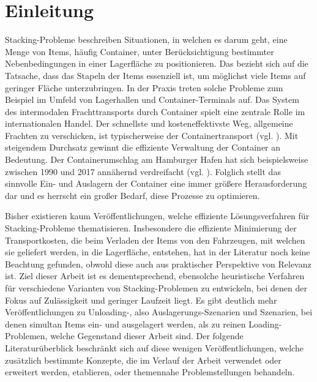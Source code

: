 \section{Einleitung}
\label{sec:einleitung}

Stacking-Probleme beschreiben Situationen, in welchen es darum geht, eine Menge von Items, häufig Container,
unter Berücksichtigung bestimmter Nebenbedingungen in einer Lagerfläche zu positionieren. Das 
bezieht sich auf die Tatsache, dass das Stapeln der Items essenziell ist, um möglichst viele Items
auf geringer Fläche unterzubringen. In der Praxis treten solche Probleme zum Beispiel im Umfeld von Lagerhallen
und Container-Terminals auf.\newline
Das System des intermodalen Frachttransports durch Container spielt eine zentrale Rolle im internationalen Handel.
Der schnellste und kosteneffektivste Weg, allgemeine Frachten zu verschicken, ist typischerweise der
Containertransport (vgl. \citet{Briskorn2018}).
Mit steigendem Durchsatz gewinnt die effiziente Verwaltung der Container an Bedeutung.
Der Containerumschlag am Hamburger Hafen hat sich beispielsweise zwischen 1990 und 2017
annähernd verdreifacht (vgl. \citet{Port_of_Hamburg}).
Folglich stellt das sinnvolle Ein- und Auslagern der Container eine immer größere Herausforderung dar und
es herrscht ein großer Bedarf, diese Prozesse zu optimieren.

Bisher existieren kaum Veröffentlichungen, welche effiziente Lösungsverfahren für Stacking-Probleme thematisieren.
Insbesondere die effiziente Minimierung der Transportkosten, die beim Verladen der Items von den Fahrzeugen,
mit welchen sie geliefert werden, in die Lagerfläche, entstehen, hat in der Literatur noch keine Beachtung gefunden,
obwohl diese auch aus praktischer Perspektive von Relevanz ist. Ziel dieser Arbeit ist es dementsprechend,
ebensolche heuristische Verfahren für verschiedene Varianten von Stacking-Problemen zu entwickeln, bei denen der Fokus auf
Zulässigkeit und geringer Laufzeit liegt.\newline
Es gibt deutlich mehr Veröffentlichungen zu Unloading-, also Auslagerungs-Szenarien und Szenarien, bei denen simultan Items
ein- und ausgelagert werden, als zu reinen Loading-Problemen, welche Gegenstand dieser Arbeit sind.
Der folgende Literaturüberblick beschränkt sich auf diese wenigen Veröffentlichungen, welche zusätzlich bestimmte Konzepte,
die im Verlauf der Arbeit verwendet oder erweitert werden, etablieren, oder themennahe Problemstellungen behandeln.

